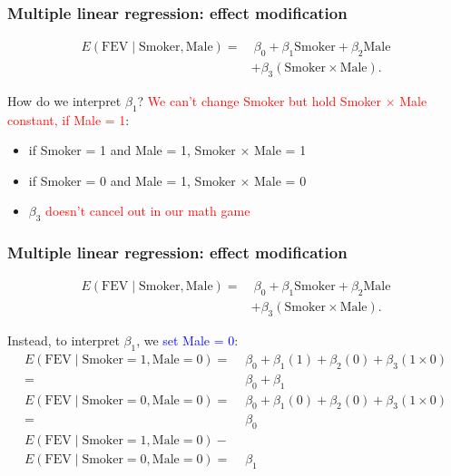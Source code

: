 \documentclass[12pt, 
hyperref={colorlinks=true, linkcolor=blue, urlcolor=cyan},dvipsnames]{beamer}
\begin{document}
\begin{frame}
\frametitle{Multiple linear regression: effect modification}
\begin{align*}
E(\text{FEV} \mid \text{Smoker}, \text{Male}) = & \ \beta_0 + \beta_1 \text{Smoker} + \beta_2 \text{Male}\\
& + \beta_3 (\text{Smoker} \times \text{Male}).
\end{align*}

How do we interpret $\beta_1$? \pause
\textcolor{red}{We can't change Smoker but hold Smoker $\times$ Male constant, if Male = 1}: 
\begin{itemize}
\item if Smoker = 1 and Male = 1, Smoker $\times$ Male = 1
\item if Smoker = 0 and Male = 1, Smoker $\times$ Male = 0
\item $\beta_3$ \textcolor{red}{doesn't cancel out in our math game}
\end{itemize}
\end{frame}

\begin{frame}
\frametitle{Multiple linear regression: effect modification}
\begin{align*}
E(\text{FEV} \mid \text{Smoker}, \text{Male}) = & \ \beta_0 + \beta_1 \text{Smoker} + \beta_2 \text{Male}\\
& + \beta_3 (\text{Smoker} \times \text{Male}).
\end{align*}

Instead, to interpret $\beta_1$, we \textcolor{blue}{set Male = 0}:
{\small \begin{align*}
E(\text{FEV} \mid \text{Smoker} = 1, \text{Male} = 0) =&  \ \beta_0 + \beta_1 (1) + \beta_2 (0) + \beta_3 (1 \times 0) \\
= & \ \beta_0 + \beta_1 \\
E(\text{FEV} \mid \text{Smoker} = 0, \text{Male} = 0) =&  \ \beta_0 + \beta_1 (0) + \beta_2 (0) + \beta_3 (1 \times 0) \\
 =& \ \beta_0 \\
E(\text{FEV} \mid \text{Smoker} = 1, \text{Male} = 0) - \ &\\
E(\text{FEV} \mid \text{Smoker} = 0, \text{Male} = 0) =& \ \beta_1
\end{align*}
}
\end{frame}
\end{document}
